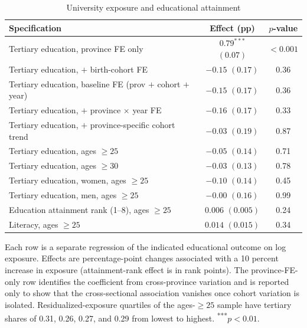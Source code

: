 \begin{table}[htbp]
  \centering
  \caption{University exposure and educational attainment}
  \label{tab:appfirststage}
  \begin{threeparttable}
  \begin{tabular}{L{7.6cm}cc}
    \toprule
    Specification & Effect (pp) & $p$-value \\
    \midrule
    Tertiary education, province FE only                 & $0.79^{***}$ $(0.07)$ & $<0.001$ \\
    Tertiary education, $+$ birth-cohort FE              & $-0.15$ $(0.17)$ & 0.36 \\
    Tertiary education, baseline FE (prov $+$ cohort $+$ year) & $-0.15$ $(0.17)$ & 0.36 \\
    Tertiary education, $+$ province $\times$ year FE     & $-0.16$ $(0.17)$ & 0.33 \\
    Tertiary education, $+$ province-specific cohort trend & $-0.03$ $(0.19)$ & 0.87 \\
    \addlinespace
    Tertiary education, ages $\geq 25$                    & $-0.05$ $(0.14)$ & 0.71 \\
    Tertiary education, ages $\geq 30$                    & $-0.03$ $(0.13)$ & 0.78 \\
    Tertiary education, women, ages $\geq 25$             & $-0.10$ $(0.14)$ & 0.45 \\
    Tertiary education, men, ages $\geq 25$               & $-0.00$ $(0.16)$ & 0.99 \\
    \addlinespace
    Education attainment rank (1--8), ages $\geq 25$      & $0.006$ $(0.005)$ & 0.24 \\
    Literacy, ages $\geq 25$                              & $0.014$ $(0.015)$ & 0.34 \\
    \bottomrule
  \end{tabular}
  \begin{tablenotes}[flushleft]
    \footnotesize
    \item Each row is a separate regression of the indicated educational outcome on log exposure.
    Effects are percentage-point changes associated with a 10 percent increase in exposure
    (attainment-rank effect is in rank points). The province-FE-only row identifies the
    coefficient from cross-province variation and is reported only to show that the cross-sectional
    association vanishes once cohort variation is isolated. Residualized-exposure quartiles of the
    ages-$\geq 25$ sample have tertiary shares of 0.31, 0.26, 0.27, and 0.29 from lowest to highest.
    \textsuperscript{***}$p<0.01$.
  \end{tablenotes}
  \end{threeparttable}
\end{table}


